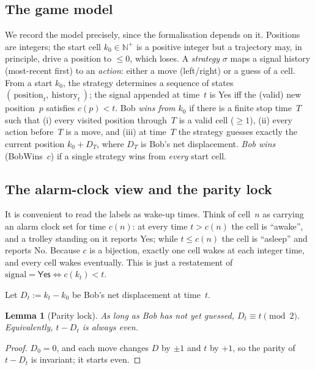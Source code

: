 \documentclass{article}
\newtheorem{lemma}[theorem]{Lemma}
\newcommand{\Np}{\mathbb{N}^{+}}
\newcommand{\Yes}{\textsf{Yes}}
\newcommand{\No}{\textsf{No}}
\newcommand{\lean}[1]{{\small\ttfamily #1}}
\begin{document}
\subsection{The game model}\label{sec:model}

We record the model precisely, since the formalisation depends on it.
Positions are integers; the start cell $k_0\in\Np$ is a positive integer
but a trajectory may, in principle, drive a position to $\le 0$, which
loses. A \emph{strategy} $\sigma$ maps a signal history (most-recent
first) to an \emph{action}: either a move (\textsf{left}/\textsf{right})
or a guess of a cell. From a start $k_0$, the strategy determines a
sequence of states $(\,\text{position}_t,\ \text{history}_t\,)$; the
signal appended at time~$t$ is \Yes{} iff the (valid) new position~$p$
satisfies $c(p)<t$. Bob \emph{wins from $k_0$} if there is a finite stop
time~$T$ such that (i) every visited position through~$T$ is a valid cell
($\ge 1$), (ii) every action before~$T$ is a move, and (iii) at time~$T$
the strategy guesses exactly the current position $k_0 + D_T$, where
$D_T$ is Bob's net displacement. \emph{Bob wins} (\lean{BobWins}~$c$)
if a single strategy wins from \emph{every} start cell.

\subsection{The alarm-clock view and the parity lock}
\label{sec:reform}

It is convenient to read the labels as wake-up times. Think of cell~$n$
as carrying an alarm clock set for time $c(n)$: at every time
$t > c(n)$ the cell is ``awake'', and a trolley standing on it reports
\Yes; while $t \le c(n)$ the cell is ``asleep'' and reports \No. Because
$c$ is a bijection, exactly one cell wakes at each integer time, and
every cell wakes eventually. This is just a restatement of
$\text{signal}=\Yes \iff c(k_t) < t$.

Let $D_t := k_t - k_0$ be Bob's net displacement at time~$t$.

\begin{lemma}[Parity lock]\label{lem:parity}
As long as Bob has not yet guessed, $D_t \equiv t \pmod 2$. Equivalently,
$t - D_t$ is always even.
\end{lemma}
\begin{proof}
$D_0=0$, and each move changes $D$ by $\pm 1$ and $t$ by $+1$, so the
parity of $t-D_t$ is invariant; it starts even.
\end{proof}
\end{document}
